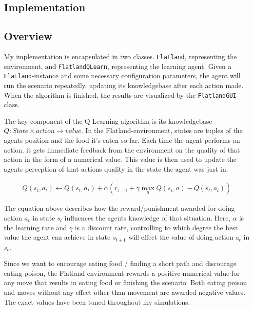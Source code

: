 \documentclass[twoside]{article}
\begin{document}
\begin{multicols}{2} %

    \section{Implementation}

    \subsection{Overview}

    My implementation is encapsulated in two classes.
    \texttt{Flatland}, representing the environment, and \texttt{FlatlandQLearn}, representing the learning agent.
    Given a \texttt{Flatland}-instance and some necessary configuration parameters, the agent will run the scenario repeatedly, updating its knowledgebase after each action made.
    When the algorithm is finished, the results are visualized by the \texttt{FlatlandGUI}-class.

    The key component of the Q-Learning algorithm is its knowledgebase $Q: State \times action \rightarrow value$.
    In the Flatland-environment, states are tuples of the agents position and the food it's eaten so far.
    Each time the agent performs an action, it gets immediate feedback from the environment on the quality of that action in the form of a numerical value.
    This value is then used to update the agents perception of that actions quality in the state the agent was just in.
    
    \begin{gather*}
        Q(s_t, a_t) \leftarrow Q(s_t, a_t) + \alpha (r_{t+1} + \gamma \max_{a}Q(s_t, a) - Q(s_t, a_t))
    \end{gather*}

    The equation above describes how the reward/punishment awarded for doing action $a_t$ in state $s_t$ influences the agents knowledge of that situation.
    Here, $\alpha$ is the learning rate and $\gamma$ is a discount rate, controlling to which degree the best value the agent can achieve in state $s_{t+1}$ will effect the value of doing action $a_t$ in $s_t$.

    Since we want to encourage eating food / finding a short path and discourage eating poison, the Flatland environment rewards a positive numerical value for any move that results in eating food or finishing the scenario.
    Both eating poison and moves without any effect other than movement are awarded negative values.
    The exact values have been tuned throughout my simulations.
    

\end{multicols}
\end{document}
